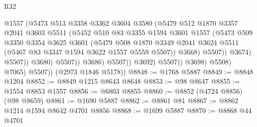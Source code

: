 \begin{lexlean}{R32}
\begin{coremodule}
                                      @1557
                                      (@5473
                                        @513
                                        @3358
                                        @3362
                                        @3604
                                        @3580
                                        (@5479
                                          @512
                                          @1870
                                          @3357
                                          @2041
                                          @3603
                                          @5511
                                          (@5452
                                            @510
                                            @83
                                            @3355
                                            @1594
                                            @3601
                                            @1557
                                            (@5473
                                              @509
                                              @3350
                                              @3354
                                              @3625
                                              @3601
                                              (@5479
                                                @508
                                                @1870
                                                @3349
                                                @2041
                                                @3624
                                                @5511
                                                (@5467 @83 @3347 @1594 @3622 @1557 @5559 @5507))
                                              @3668)
                                            @5507))
                                        @3674)
                                      @5507))
                                  @3680)
                                @5507))
                            @3686)
                          @5507))
                      @3692)
                    @5507))
                @3698)
              @5508)
            @7065)
          @5507))
      (@2973 @1846 @5178))
@8848 := @1768 @5887
@8849 := @8848 @1204
@8852 := @8849 @1215 @8643 @8648
@8853 := @98 @8647
@8855 := @1554 @8853 @1557
@8856 := @6803 @8855
@8860 := @8852 (@4724 @8856) (@98 @8659)
@8861 := @1690 @5887
@8862 := @8861 @81
@8867 := @8862 @1214 @1594 @8642 @4701 @8856
@8868 := @1699 @5887
@8870 := @8868 @44 @4701

\end{coremodule}
\end{lexlean}
